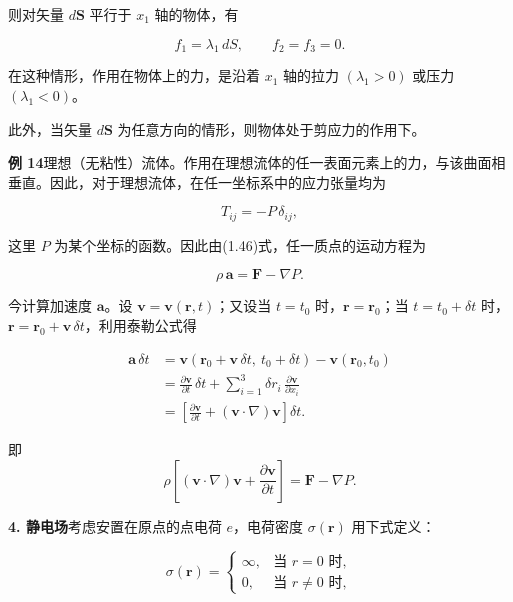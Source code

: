 \documentclass[11pt,a4paper,oneside]{ctexbook}
\newcommand{\ve}[1]{\bm{#1}}
\begin{document}
则对矢量 $d\ve{S}$ 平行于 $x_1$ 轴的物体，有

\begin{equation*}
f_1 = \lambda_1\, dS, \qquad f_2 = f_3 = 0.
\end{equation*}

在这种情形，作用在物体上的力，是沿着 $x_1$ 轴的拉力 $(\lambda_1 > 0)$ 或压力 $(\lambda_1 < 0)$。

此外，当矢量 $d\ve{S}$ 为任意方向的情形，则物体处于剪应力的作用下。

\textbf{例 14}\quad 理想（无粘性）流体。作用在理想流体的任一表面元素上的力，与该曲面相垂直。因此，对于理想流体，在任一坐标系中的应力张量均为

\begin{equation*}
T_{ij} = -P\, \delta_{ij},
\end{equation*}

这里 $P$ 为某个坐标的函数。因此由(1.46)式，任一质点的运动方程为

\begin{equation*}
\rho\, \ve{a} = \ve{F} - \nabla P.
\end{equation*}

今计算加速度 $\ve{a}$。设 $\ve{v} = \ve{v}(\ve{r}, t)$；又设当 $t = t_0$ 时，$\ve{r} = \ve{r}_0$；当 $t = t_0 + \delta t$ 时，$\ve{r} = \ve{r}_0 + \ve{v}\,\delta t$，利用泰勒公式得

\begin{equation*}
\begin{aligned}
\ve{a}\,\delta t &= \ve{v}(\ve{r}_0 + \ve{v}\,\delta t,\ t_0 + \delta t) - \ve{v}(\ve{r}_0, t_0)\\
&= \frac{\partial\ve{v}}{\partial t}\,\delta t + \sum_{i=1}^{3} \delta r_i\, \frac{\partial\ve{v}}{\partial x_i}\\
&= \left[\frac{\partial\ve{v}}{\partial t} + (\ve{v} \cdot \nabla)\ve{v}\right] \delta t.
\end{aligned}
\end{equation*}

即
\begin{equation*}
\rho \left[(\ve{v} \cdot \nabla)\ve{v} + \frac{\partial\ve{v}}{\partial t}\right] = \ve{F} - \nabla P.
\end{equation*}

\textbf{4. 静电场}\quad 考虑安置在原点的点电荷 $e$，电荷密度 $\sigma(\ve{r})$ 用下式定义：

\begin{equation*}
\sigma(\ve{r}) =
\begin{cases}
\infty, & \text{当 } r = 0 \text{ 时},\\
0,     & \text{当 } r \neq 0 \text{ 时},
\end{cases}
\end{equation*}
\end{document}
